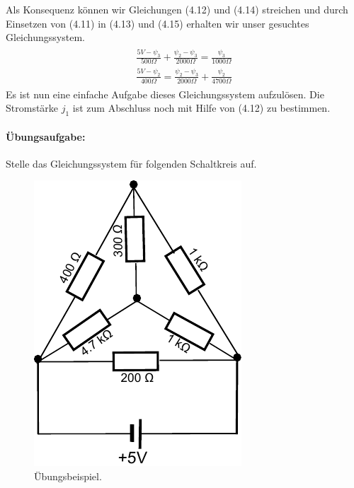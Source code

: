 \documentclass[11pt,a4paper,leqno]{report}
\numberwithin{equation}{chapter}
\begin{document}
Als Konsequenz k\"onnen wir Gleichungen (4.12) und (4.14) streichen und durch Einsetzen von (4.11) in (4.13) und (4.15) erhalten wir unser gesuchtes Gleichungssystem.
\begin{align} 
\begin{split}
\frac{5V - \psi_3}{500\Omega} + \frac{\psi_2 - \psi_3}{2000\Omega} = \frac{ \psi_3}{1000\Omega}\\
\frac{5V - \psi_2}{400\Omega} = \frac{\psi_2 - \psi_3}{2000\Omega} + \frac{ \psi_2}{4700\Omega}
\end{split}
\end{align}
Es ist nun eine einfache Aufgabe dieses Gleichungssystem aufzul\"osen. Die Stromst\"arke $j_1$ ist zum Abschluss noch mit Hilfe von (4.12) zu bestimmen.
\paragraph{\"Ubungsaufgabe:} Stelle das Gleichungssystem f\"ur folgenden Schaltkreis auf.
\begin{figure}[H]
	\begin{center}
		\includegraphics[scale=0.8]{ub.pdf}
		\caption{\"Ubungsbeispiel.}
	\end{center}
\end{figure}
\noindent
\end{document}
